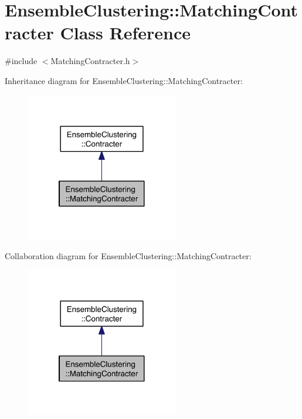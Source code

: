\hypertarget{class_ensemble_clustering_1_1_matching_contracter}{\section{Ensemble\-Clustering\-:\-:Matching\-Contracter Class Reference}
\label{class_ensemble_clustering_1_1_matching_contracter}
}


{\ttfamily \#include $<$Matching\-Contracter.\-h$>$}



Inheritance diagram for Ensemble\-Clustering\-:\-:Matching\-Contracter\-:
\nopagebreak
\begin{figure}[H]
\begin{center}
\leavevmode
\includegraphics[width=188pt]{class_ensemble_clustering_1_1_matching_contracter__inherit__graph}
\end{center}
\end{figure}


Collaboration diagram for Ensemble\-Clustering\-:\-:Matching\-Contracter\-:
\nopagebreak
\begin{figure}[H]
\begin{center}
\leavevmode
\includegraphics[width=188pt]{class_ensemble_clustering_1_1_matching_contracter__coll__graph}
\end{center}
\end{figure}
